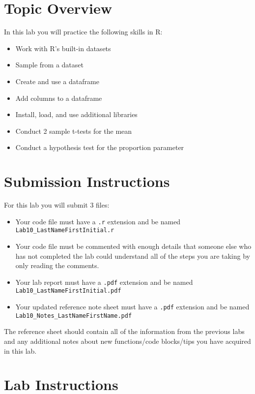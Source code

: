 \documentclass{article}
\begin{document}
\section{Topic Overview}

In this lab you will practice the following skills in R:
\begin{itemize}
    \item Work with R’s built-in datasets
    \item Sample from a dataset
    \item Create and use a dataframe
    \item Add columns to a dataframe
    \item Install, load, and use additional libraries
    \item Conduct 2 sample t-tests for the mean
    \item Conduct a hypothesis test for the proportion parameter
\end{itemize}

\section*{Submission Instructions}

For this lab you will submit 3 files:
\begin{itemize}
    \item Your code file must have a \texttt{.r} extension and be named \texttt{Lab10\_LastNameFirstInitial.r}
    \item Your code file must be commented with enough details that someone else who has not completed the lab could understand all of the steps you are taking by only reading the comments.
    \item Your lab report must have a \texttt{.pdf} extension and be named \texttt{Lab10\_LastNameFirstInitial.pdf}
    \item Your updated reference note sheet must have a \texttt{.pdf} extension and be named \texttt{Lab10\_Notes\_LastNameFirstName.pdf}
\end{itemize}

The reference sheet should contain all of the information from the previous labs and any additional notes about new functions/code blocks/tips you have acquired in this lab.

\section*{Lab Instructions}
\end{document}
